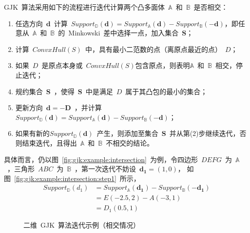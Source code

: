 GJK~算法采用如下的流程进行迭代计算两个凸多面体~$\mathbb{A}$~和~$\mathbb{B}$~是否相交：

\begin{enumerate}[(1)]
  \item 任选方向~$\bm{d}$~计算~$Support_\mathbb{D}(\bm{d}) = Support_\mathbb{A}(\bm{d}) - Support_\mathbb{B}(-\bm{d})$，即任意从~$\mathbb{A}$~和~$\mathbb{B}$~的~Minkowski~差中选择一点，加入集合~$\bm{S}$；
  \item 计算~$ConvxHull(S)$~中，具有最小二范数的点（离原点最近的点）~$D$； 
  \item 如果~$D$~是原点本身或~$ConvxHull(S)$包含原点，则表明$\mathbb{A}$~和~$\mathbb{B}$~相交，停止迭代；
  \item 规约集合~$\bm{S}$~，使得~$\bm{S}$~中是满足~$D$~属于其凸包的最小的集合；
  \item 更新方向~$\bm{d} = -\bm{D}$~，并计算~$Support_\mathbb{D}(\bm{d}) = Support_\mathbb{A}(\bm{d}) - Support_\mathbb{B}(-\bm{d})$；
  \item 如果有新的$Support_\mathbb{D}(\bm{d})$~产生，则添加至集合~$\bm{S}$~并从第(2)步继续迭代，否则结束迭代，且得出~$\mathbb{A}$~和~$\mathbb{B}$~不相交的结论。
\end{enumerate}

具体而言，仍以图~\ref{fig:gjk:example:intersection}~为例，令四边形~$DEFG$~为~$\mathbb{A}$~，三角形~$ABC$~为~$\mathbb{B}$~，第一次迭代不妨设~$\bm{d_1} = (1,0)$，
如图~\ref{fig:gjk:example:intersection:step1}~所示，
\begin{equation}
  \begin{array}{ll}
    Support_\mathbb{D}(d_1) & = Support_\mathbb{A}(\bm{d_1}) - Support_\mathbb{B}(-\bm{d_1}) \\
                            & = E(-2.5, 2) - A(-3,1) \\
                            & = D_1(0.5, 1)
  \end{array}
  \label{euqa:gjk:step1}
\end{equation}

\begin{figure}[htb]
\centering
{} 
\caption{二维~GJK~算法迭代示例（相交情况）}
\label{fig:gjk:example:2d:intersection:iterator}
\end{figure}

